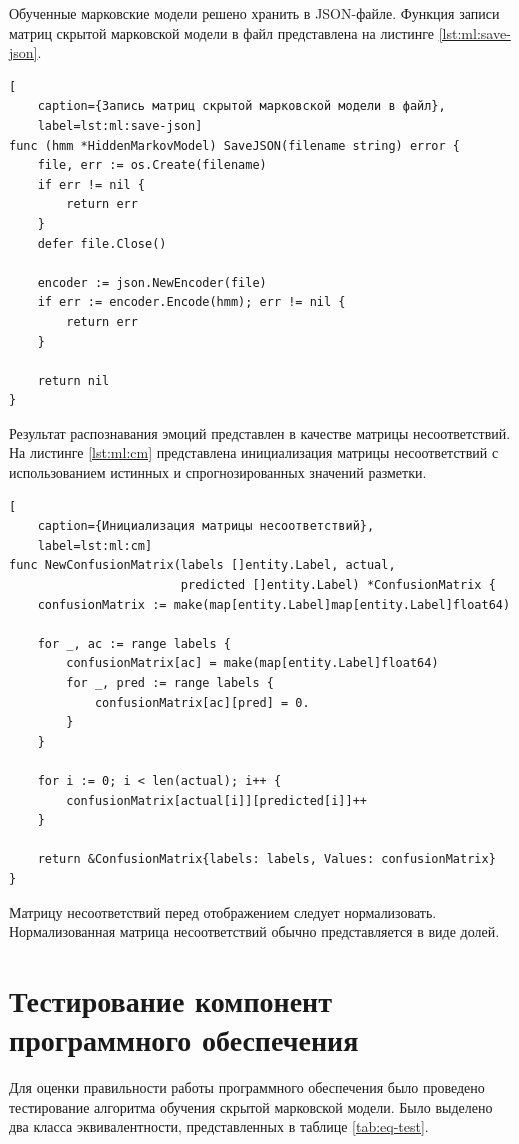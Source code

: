Обученные марковские модели решено хранить в JSON-файле. Функция записи матриц скрытой марковской модели в файл представлена на листинге \ref{lst:ml:save-json}.
\begin{lstlisting}[
	caption={Запись матриц скрытой марковской модели в файл},
	label=lst:ml:save-json]
func (hmm *HiddenMarkovModel) SaveJSON(filename string) error {
	file, err := os.Create(filename)
	if err != nil {
		return err
	}
	defer file.Close()
	
	encoder := json.NewEncoder(file)
	if err := encoder.Encode(hmm); err != nil {
		return err
	}
	
	return nil
}
\end{lstlisting}

Результат распознавания эмоций представлен в качестве матрицы несоответствий. На листинге \ref{lst:ml:cm} представлена инициализация матрицы несоответствий с использованием истинных и спрогнозированных значений разметки.
\begin{lstlisting}[
	caption={Инициализация матрицы несоответствий},
	label=lst:ml:cm]
func NewConfusionMatrix(labels []entity.Label, actual,
						predicted []entity.Label) *ConfusionMatrix {
	confusionMatrix := make(map[entity.Label]map[entity.Label]float64)
	
	for _, ac := range labels {
		confusionMatrix[ac] = make(map[entity.Label]float64)
		for _, pred := range labels {
			confusionMatrix[ac][pred] = 0.
		}
	}
	
	for i := 0; i < len(actual); i++ {
		confusionMatrix[actual[i]][predicted[i]]++
	}
	
	return &ConfusionMatrix{labels: labels, Values: confusionMatrix}
}
\end{lstlisting}
Матрицу несоответствий перед отображением следует нормализовать. Нормализованная матрица несоответствий обычно представляется в виде долей. 

\section{Тестирование компонент программного обеспечения}
Для оценки правильности работы программного обеспечения было проведено тестирование алгоритма обучения скрытой марковской модели. Было выделено два класса эквивалентности, представленных в таблице \ref{tab:eq-test}.

